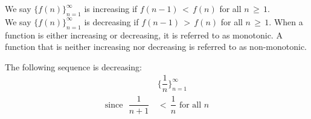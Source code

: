 \begin{definition}
We say $\{f(n)\}_{n=1}^{\infty}$ is increasing if $f(n-1) \hspace{2pt} < \hspace{2pt} f(n)$ for all $n \hspace{2pt} \geq \hspace{2pt} 1$.\\[1ex]
We say $\{f(n)\}_{n=1}^{\infty}$ is decreasing if $f(n-1) \hspace{2pt} > \hspace{2pt} f(n)$ for all $n \hspace{2pt} \geq \hspace{2pt} 1$. When a function is either increasing or decreasing, it is referred to as monotonic. A function that is neither increasing nor decreasing is referred to as non-monotonic.
\end{definition}

\begin{example}
The following sequence is decreasing:
\begin{align*}
    &\Big\{\dfrac{1}{n}\Big\}_{n=1}^{\infty}\\[2ex]
    \text{since } \hspace{4pt} \dfrac{1}{n+1} \hspace{2pt} &< \hspace{2pt} \dfrac{1}{n} \hspace{4pt} \text{for all} \hspace{4pt} n
\end{align*}
\end{example}

